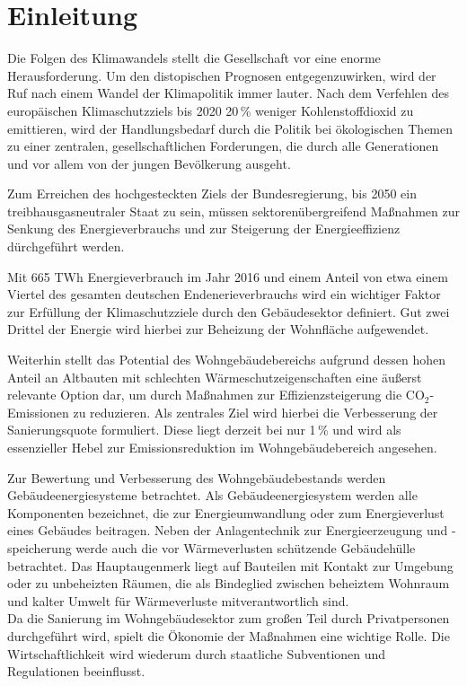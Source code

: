 \chapter{Einleitung}

Die Folgen des Klimawandels stellt die Gesellschaft vor eine enorme Herausforderung.
Um den distopischen Prognosen entgegenzuwirken, wird der Ruf nach einem Wandel der Klimapolitik immer lauter.
Nach dem Verfehlen des europäischen Klimaschutzziels bis 2020 20\,\% weniger Kohlenstoffdioxid zu emittieren, wird der Handlungsbedarf durch die Politik bei ökologischen Themen zu einer zentralen, gesellschaftlichen Forderungen, die durch alle Generationen und vor allem von der jungen Bevölkerung ausgeht. \cite{Umweltbundesamt.2019} 

Zum Erreichen des hochgesteckten Ziels der Bundesregierung, bis 2050 ein treibhausgasneutraler Staat zu sein, müssen sektorenübergreifend Maßnahmen zur Senkung des Energieverbrauchs und zur Steigerung der Energieeffizienz dürchgeführt werden. \cite{BundesministeriumfurUmweltNaturschutzundnukleareSicherheit.2017}

Mit 665 TWh Energieverbrauch im Jahr 2016 und einem Anteil von etwa einem Viertel des gesamten deutschen Endenerieverbrauchs wird ein wichtiger Faktor zur Erfüllung der Klimaschutzziele durch den Gebäudesektor definiert.
Gut zwei Drittel der Energie wird hierbei zur Beheizung der Wohnfläche aufgewendet. \cite{Umweltbundesamt.2018}

Weiterhin stellt das Potential des Wohngebäudebereichs aufgrund dessen hohen Anteil an Altbauten mit schlechten Wärmeschutzeigenschaften eine äußerst relevante Option dar, um durch Maßnahmen zur Effizienzsteigerung die CO\(_2\)-Emissionen zu reduzieren.
Als zentrales Ziel wird hierbei die Verbesserung der Sanierungsquote formuliert. 
Diese liegt derzeit bei nur 1\,\% und wird als essenzieller Hebel zur Emissionsreduktion im Wohngebäudebereich angesehen. \cite{WohnenundSanieren.24.06.2019}

Zur Bewertung und Verbesserung des Wohngebäudebestands werden Gebäudeenergiesysteme betrachtet.
Als Gebäudeenergiesystem werden alle Komponenten bezeichnet, die zur Energieumwandlung oder zum Energieverlust eines Gebäudes beitragen.
Neben der Anlagentechnik zur Energieerzeugung und -speicherung werde auch die vor Wärmeverlusten schützende Gebäudehülle betrachtet.
Das Hauptaugenmerk liegt auf Bauteilen mit Kontakt zur Umgebung oder zu unbeheizten Räumen, die als Bindeglied zwischen beheiztem Wohnraum und kalter Umwelt für Wärmeverluste mitverantwortlich sind. \\
Da die Sanierung im Wohngebäudesektor zum großen Teil durch Privatpersonen durchgeführt wird, spielt die Ökonomie der Maßnahmen eine wichtige Rolle.
Die Wirtschaftlichkeit wird wiederum durch staatliche Subventionen und Regulationen beeinflusst.


